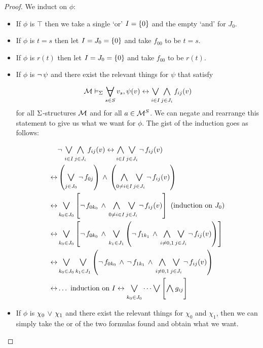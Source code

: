 \begin{proof}
    We induct on $\phi$:
    \begin{itemize}
        \item If $\phi$ is $\top$ 
            then we take a single `or' $I = \left\{0\right\}$ and the empty `and' for 
            $J_{0}$.
        \item If $\phi$ is $t = s$ then
            let $I = J_{0} = \left\{0\right\}$ and take $f_{00}$ to be $t = s$.
        \item If $\phi$ is $r(t)$ then 
            let $I = J_{0} = \left\{0\right\}$ and take $f_{00}$ to be $r(t)$.
        \item If $\phi$ is $\neg\, \psi$ and there exist the relevant things for 
            $\psi$ that satisfy
            \[ 
                \MM \model{\Si} \bigforall{s \in S}{}v_s, \psi(v) 
                \IFF \bigor{i \in I}{} 
                \bigand{j \in J_{i}}{} f_{ij}(v)
            \]
            for all $\Sigma$-structures $\mathcal{M}$ and for all $a \in {\mathcal{M}}^S$.
            We can negate and rearrange this statement to give us what we 
            want for $\phi$.
            The gist of the induction goes as follows:
            \begin{align*}
                &\NOT \bigor{i \in I}{} 
                \bigand{j \in J_{i}}{} f_{ij}(v) \IFF 
                \bigand{i \in I}{} 
                \bigor{j \in J_{i}}{} \NOT f_{ij}(v)\\
                \IFF &\brkt{\bigor{j \in J_0}{} \NOT f_{0j}} \AND
                \brkt{\bigand{0 \ne i \in I}{} 
                \bigor{j \in J_{i}}{} \NOT f_{ij}(v)} \\
                 \IFF 
                &\bigor{k_0 \in J_0}{} 
                \sqbrkt{\NOT f_{0k_0} \AND \bigand{0 \ne i \in I}{} 
                \bigor{j \in J_{i}}{} \NOT f_{ij}(v)}
                \text{ (induction on $J_0$)}\\
                \IFF & \bigor{k_0 \in J_0}{} 
                \sqbrkt{\NOT f_{0k_0} \AND \bigor{k_1 \in J_1}{} 
                \brkt{\NOT f_{1k_1} \AND \bigand{i \ne 0, 1}{} 
                \bigor{j \in J_{i}}{} \NOT f_{ij}(v)}} \\
                \IFF & \bigor{k_0 \in J_0}{} 
                \bigor{k_1 \in J_1}{} 
                \brkt{\NOT f_{0k_0} \AND \NOT f_{1k_1} 
                \AND \bigand{i \ne 0, 1}{} 
                \bigor{j \in J_{i}}{} \NOT f_{ij}(v)} \\
                \IFF & \dots \text{ induction on $I$} 
                \IFF \bigor{k_0 \in J_0}{} \dots \bigor{}{}
                \sqbrkt{\bigand{}{}g_{ij}}
            \end{align*}
        \item If $\phi$ is $\chi_0 \, \lor \, \chi_1$ 
            and there exist the relevant things 
            for $\chi_0$ and $\chi_1$, then we can simply take the or of
            the two formulas found and obtain what we want.
    \end{itemize}
\end{proof}


